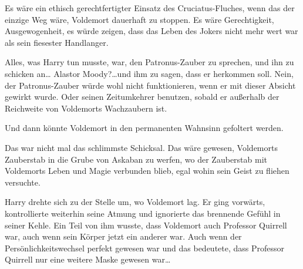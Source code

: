 Es wäre ein ethisch gerechtfertigter Einsatz des Cruciatus-Fluches, wenn das der einzige Weg wäre, Voldemort dauerhaft zu stoppen. Es wäre Gerechtigkeit, Ausgewogenheit, es würde zeigen, dass das Leben des Jokers nicht mehr wert war als sein fiesester Handlanger.

Alles, was Harry tun musste, war, den Patronus-Zauber zu sprechen, und ihn zu schicken an… Alastor Moody?…und ihm zu sagen, dass er herkommen soll. Nein, der Patronus-Zauber würde wohl nicht funktionieren, wenn er mit dieser Absicht gewirkt wurde. Oder seinen Zeitumkehrer benutzen, sobald er außerhalb der Reichweite von Voldemorts Wachzaubern ist.

Und dann könnte Voldemort in den permanenten Wahnsinn gefoltert werden.

Das war nicht mal das schlimmste Schicksal. Das wäre gewesen, Voldemorts Zauberstab in die Grube von Askaban zu werfen, wo der Zauberstab mit Voldemorts Leben und Magie verbunden blieb, egal wohin sein Geist zu fliehen versuchte.

Harry drehte sich zu der Stelle um, wo Voldemort lag. Er ging vorwärts, kontrollierte weiterhin seine Atmung und ignorierte das brennende Gefühl in seiner Kehle. Ein Teil von ihm wusste, dass Voldemort auch Professor Quirrell war, auch wenn sein Körper jetzt ein anderer war. Auch wenn der Persönlichkeitswechsel perfekt gewesen war und das bedeutete, dass Professor Quirrell nur eine weitere Maske gewesen war…


